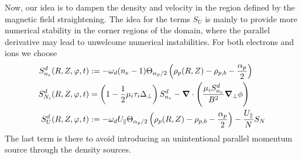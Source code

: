 Now, our idea is to dampen the density and velocity in the region defined by the
magnetic field straightening.
The idea for the terms $S_U$ is mainly to provide more numerical stability
in the corner regions of the domain, where the parallel derivative may lead
to unwelcome numerical instabilities.
For both electrons and ions we choose
\begin{subequations} \label{eq:velocity_source}
\begin{align}
    S^d_{n_e}(R,Z,\varphi,t) &:= -\omega_d (n_e-1)\Theta_{\alpha_p/2}\left(\rho_p(R,Z) - \rho_{p,b} - \frac{\alpha_p}{2}\right)\\
    S^d_{N_i}(R,Z,\varphi,t) &= \left(1-\frac{1}{2}\mu_i \tau_i \Delta_\perp\right) S^d_{n_e} -{\boldsymbol{\nabla}}\cdot\left( \frac{\mu_i S^d_{n_e}}{B^2}{\boldsymbol{\nabla}}_{\perp} \phi\right)\\
    S^d_U(R,Z,\varphi, t)& := -\omega_d U_\parallel \Theta_{\alpha_p/2}\left(  \rho_p(R,Z) - \rho_{p,b} - \frac{\alpha_p}{2} \right) - \frac{U_\parallel}{N} S_N
\end{align}
\end{subequations}
The last term is there to avoid introducing an unintentional parallel momentum source through the
density sources.

